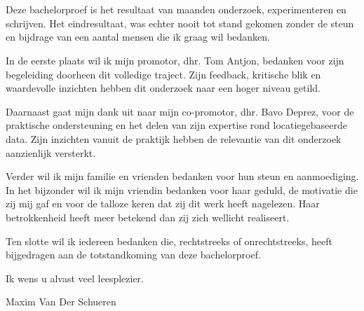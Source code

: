 
\chapter*{}%
\label{ch:voorwoord}


Deze bachelorproef is het resultaat van maanden onderzoek, experimenteren en schrijven. Het eindresultaat, was echter nooit tot stand gekomen zonder de steun en bijdrage van een aantal mensen die ik graag wil bedanken.

\vspace{1em}

In de eerste plaats wil ik mijn promotor, dhr. Tom Antjon, bedanken voor zijn begeleiding doorheen dit volledige traject. Zijn feedback, kritische blik en waardevolle inzichten hebben dit onderzoek naar een hoger niveau getild.

\vspace{1em}

Daarnaast gaat mijn dank uit naar mijn co-promotor, dhr. Bavo Deprez, voor de praktische ondersteuning en het delen van zijn expertise rond locatiegebaseerde data. Zijn inzichten vanuit de praktijk hebben de relevantie van dit onderzoek aanzienlijk versterkt.

\vspace{1em}

Verder wil ik mijn familie en vrienden bedanken voor hun steun en aanmoediging. In het bijzonder wil ik mijn vriendin bedanken voor haar geduld, de motivatie die zij mij gaf en voor de talloze keren dat zij dit werk heeft nagelezen. Haar betrokkenheid heeft meer betekend dan zij zich wellicht realiseert.

\vspace{1em}

Ten slotte wil ik iedereen bedanken die, rechtstreeks of onrechtstreeks, heeft bijgedragen aan de totstandkoming van deze bachelorproef.

\vspace{1em}

Ik wens u alvast veel leesplezier.

Maxim Van Der Schueren